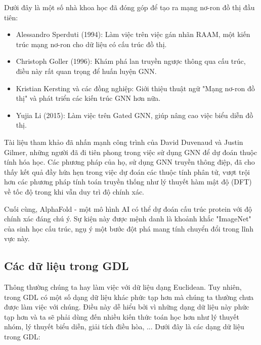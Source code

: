 Dưới đây là một số nhà khoa học đã đóng góp để tạo ra mạng nơ-ron đồ thị đầu tiên:
\begin{itemize}
    \item Alessandro Sperduti (1994): Làm việc trên việc gán nhãn RAAM, một kiến trúc mạng nơ-ron cho dữ liệu có cấu trúc đồ thị\cite{geometricdeep2022}.
    
    \item Christoph Goller (1996): Khám phá lan truyền ngược thông qua cấu trúc, điều này rất quan trọng để huấn luyện GNN\cite{geometricdeep2022}.

    \item Kristian Kersting và các đồng nghiệp: Giới thiệu thuật ngữ "Mạng nơ-ron đồ thị" và phát triển các kiến trúc GNN hơn nữa\cite{geometricdeep2022}.

    \item Yujia Li (2015): Làm việc trên Gated GNN, giúp nâng cao việc biểu diễn đồ thị\cite{geometricdeep2022}.
\end{itemize}

Tài liệu tham khảo \cite{geometricdeep2022} đã nhấn mạnh công trình của David Duvenaud và Justin Gilmer, những người đã đi tiên phong trong việc sử dụng GNN để dự đoán thuộc tính hóa học. Các phương pháp của họ, sử dụng GNN truyền thông điệp, đã cho thấy kết quả đầy hứa hẹn trong việc dự đoán các thuộc tính phân tử, vượt trội hơn các phương pháp tính toán truyền thống như lý thuyết hàm mật độ (DFT) về tốc độ trong khi vẫn duy trì độ chính xác.

Cuối cùng, AlphaFold - một mô hình AI có thể dự đoán cấu trúc protein với độ chính xác đáng chú ý\cite{geometricdeep2022}. Sự kiện này được mệnh danh là khoảnh khắc "ImageNet" của sinh học cấu trúc, ngụ ý một bước đột phá mang tính chuyển đổi trong lĩnh vực này.



\subsection{Các dữ liệu trong GDL}
Thông thường chúng ta hay làm việc với dữ liệu dạng Euclidean. Tuy nhiên, trong GDL có một số dạng dữ liệu khác phức tạp hơn mà chúng ta thường chưa được làm việc với chúng. Điều này dễ hiểu bởi vì những dạng dữ liệu này phức tạp hơn và ta sẽ phải dùng đến nhiều kiến thức toán học hơn như lý thuyết nhóm, lý thuyết biểu diễn, giải tích điều hòa, ... Dưới đây là các dạng dữ liệu trong GDL:

